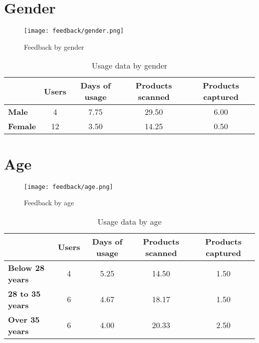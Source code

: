 \section{Gender}

    \begin{figure}[H]
      \centering
      \texttt{[image: feedback/gender.png]}
      \caption{Feedback by gender}
      \label{fig:feedback-gender}
      \end{figure}
      
    \begin{table}[H]
        \begin{tabular}{l|c|c|c|c|}
        \cline{2-5}
            & Users & Days of usage & Products scanned & Products captured \\ \hline
            \multicolumn{1}{|l|}{\textbf{Male}}     & 4          & 7.75          & 29.50            & 6.00              \\ \hline
            \multicolumn{1}{|l|}{\textbf{Female}} & 12           & 3.50          & 14.25            & 0.50              \\ \hline
        \end{tabular}
        \caption{Usage data by gender}
        \label{tab:usage-gender}
    \end{table}

\section{Age}

    \begin{figure}[H]
      \centering
      \texttt{[image: feedback/age.png]}
      \caption{Feedback by age}
      \label{fig:feedback-age}
      \end{figure}
      
    \begin{table}[H]
        \begin{tabular}{l|c|c|c|c|}
        \cline{2-5}
            & Users & Days of usage & Products scanned & Products captured \\ \hline
            \multicolumn{1}{|l|}{\textbf{Below 28 years}}     & 4          & 5.25          & 14.50            & 1.50              \\ \hline
            \multicolumn{1}{|l|}{\textbf{28 to 35 years}} & 6           & 4.67          & 18.17            & 1.50              \\ \hline
            \multicolumn{1}{|l|}{\textbf{Over 35 years}} & 6           & 4.00          & 20.33            & 2.50              \\ \hline
        \end{tabular}
        \caption{Usage data by age}
        \label{tab:usage-age}
    \end{table}

